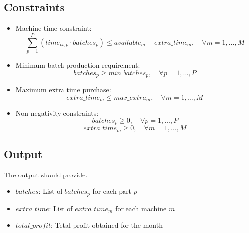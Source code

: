 \documentclass{article}
\begin{document}
\subsection*{Constraints}
\begin{itemize}
    \item Machine time constraint:
    \[
    \sum_{p=1}^{P} (time_{m,p} \cdot batches_{p}) \leq available_{m} + extra\_time_{m}, \quad \forall m = 1, \ldots, M
    \]
    
    \item Minimum batch production requirement:
    \[
    batches_{p} \geq min\_batches_{p}, \quad \forall p = 1, \ldots, P
    \]
    
    \item Maximum extra time purchase:
    \[
    extra\_time_{m} \leq max\_extra_{m}, \quad \forall m = 1, \ldots, M
    \]

    \item Non-negativity constraints:
    \[
    batches_{p} \geq 0, \quad \forall p = 1, \ldots, P
    \]
    \[
    extra\_time_{m} \geq 0, \quad \forall m = 1, \ldots, M
    \]
\end{itemize}

\subsection*{Output}
The output should provide:
\begin{itemize}
    \item $batches$: List of $batches_{p}$ for each part $p$
    \item $extra\_time$: List of $extra\_time_{m}$ for each machine $m$
    \item $total\_profit$: Total profit obtained for the month
\end{itemize}
\end{document}
